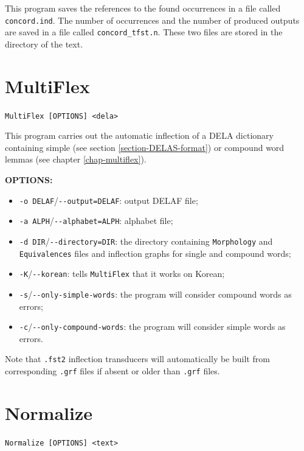 \bigskip
\noindent {}This 
program saves the references to the found occurrences in a file called
\verb+concord.ind+. The number of occurrences and the number of produced outputs
are saved in a file called \verb+concord_tfst.n+. These two files are stored in the
directory of the text.







\section{MultiFlex}
\verb+MultiFlex [OPTIONS] <dela>+

\bigskip
\noindent {}This 
program carries out the automatic inflection of a DELA dictionary 
containing simple (see section \ref{section-DELAS-format}) or compound word
lemmas (see chapter \ref{chap-multiflex}).

\bigskip
\noindent \textbf{OPTIONS:}
\begin{itemize}
  \item \verb+-o DELAF+/\verb+--output=DELAF+: output DELAF file;
  \item \verb+-a ALPH+/\verb+--alphabet=ALPH+: alphabet file;
  \item \verb+-d DIR+/\verb+--directory=DIR+: the directory containing
  \verb+Morphology+ and \verb+Equivalences+ files and inflection graphs for
                                              single and compound words;
  \item \verb+-K+/\verb+--korean+: tells \verb+MultiFlex+ that it works on
  Korean;
  \item \verb+-s+/\verb+--only-simple-words+: the program will consider
  compound words as errors;
  \item \verb+-c+/\verb+--only-compound-words+: the program will consider
  simple words as errors.
\end{itemize}

\bigskip
\noindent Note that \verb+.fst2+ inflection transducers will automatically be
built from corresponding \verb+.grf+ files if absent or older than \verb+.grf+
files.







\section{Normalize}
\verb+Normalize [OPTIONS] <text>+

